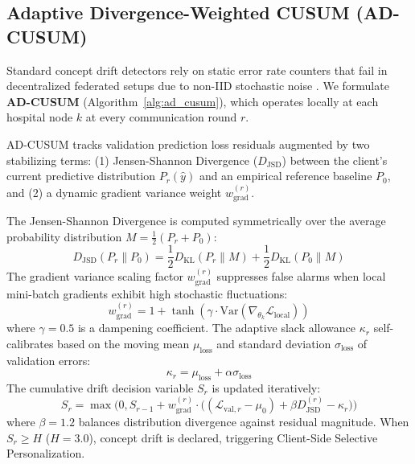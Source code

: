 \documentclass[journal,twocolumn,10pt]{IEEEtran}
\begin{document}
\subsection{Adaptive Divergence-Weighted CUSUM (AD-CUSUM)}
Standard concept drift detectors rely on static error rate counters that fail in decentralized federated setups due to non-IID stochastic noise \cite{jothimurugesan2022,bernardi2023adaptive}. We formulate \textbf{AD-CUSUM} (Algorithm~\ref{alg:ad_cusum}), which operates locally at each hospital node $k$ at every communication round $r$.

AD-CUSUM tracks validation prediction loss residuals augmented by two stabilizing terms: (1) Jensen-Shannon Divergence ($D_{\text{JSD}}$) between the client's current predictive distribution $P_r(\hat{y})$ and an empirical reference baseline $P_0$, and (2) a dynamic gradient variance weight $w_{\text{grad}}^{(r)}$.

The Jensen-Shannon Divergence is computed symmetrically over the average probability distribution $M = \frac{1}{2}(P_r + P_0)$:
\begin{equation}
D_{\text{JSD}}(P_r \parallel P_0) = \frac{1}{2} D_{\text{KL}}(P_r \parallel M) + \frac{1}{2} D_{\text{KL}}(P_0 \parallel M)
\end{equation}
The gradient variance scaling factor $w_{\text{grad}}^{(r)}$ suppresses false alarms when local mini-batch gradients exhibit high stochastic fluctuations:
\begin{equation}
w_{\text{grad}}^{(r)} = 1 + \tanh\left(\gamma \cdot \text{Var}\left(\nabla_{\theta_k} \mathcal{L}_{\text{local}}\right)\right)
\end{equation}
where $\gamma = 0.5$ is a dampening coefficient. The adaptive slack allowance $\kappa_r$ self-calibrates based on the moving mean $\mu_{\text{loss}}$ and standard deviation $\sigma_{\text{loss}}$ of validation errors:
\begin{equation}
\kappa_r = \mu_{\text{loss}} + \alpha \sigma_{\text{loss}}
\end{equation}
The cumulative drift decision variable $S_r$ is updated iteratively:
\begin{equation}
S_r = \max\Big(0, S_{r-1} + w_{\text{grad}}^{(r)} \cdot \big((\mathcal{L}_{\text{val}, r} - \mu_0) + \beta D_{\text{JSD}}^{(r)} - \kappa_r\big)\Big)
\end{equation}
where $\beta = 1.2$ balances distribution divergence against residual magnitude. When $S_r \ge H$ ($H = 3.0$), concept drift is declared, triggering Client-Side Selective Personalization.
\end{document}
